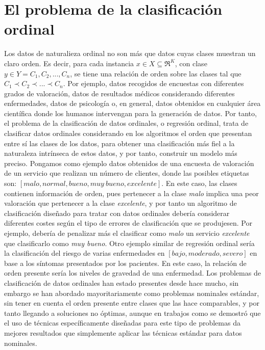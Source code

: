 \section{El problema de la clasificación ordinal}
Los datos de naturalieza ordinal no son más que datos cuyas clases muestran un claro orden. Es decir, para cada instancia $x \in X \subseteq \Re^K $, con clase $y\in Y={C_1,C_2,...,C_n}$, se tiene una relación de orden sobre las clases tal que $C_1 \prec C_2 \prec ... \prec C_n$. Por ejemplo, datos recogidos de encuestas con diferentes grados de valoración, datos de resultados médicos considerando diferentes enfermedades, datos de psicología o, en general, datos obtenidos en cualquier área científica donde los humanos intervengan para la generación de datos. \newline
Por tanto, el problema de la clasificación de datos ordinales, o regresión ordinal, trata de clasificar datos ordinales considerando en los algoritmos el orden que presentan entre sí las clases de los datos, para obtener una clasificación más fiel a la naturaleza intrínseca de estos datos, y por tanto, construir un modelo más preciso. Pongamos como ejemplo datos obtenidos de una encuesta de valoración de un servicio que realizan un número de clientes, donde las posibles etiquetas son: \textit{$\left[malo, normal, bueno, muy\ bueno, excelente\right]$}. En este caso, las clases contienen información de orden, pues pertenecer a la clase \textit{malo} implica una peor valoración que pertenecer a la clase \textit{excelente}, y por tanto un algoritmo de clasificación diseñado para tratar con datos ordinales debería considerar diferentes costes según el tipo de errores de clasificación que se produjesen. Por ejemplo, debería de penalizar más el clasificar como \textit{malo} un servicio \textit{excelente} que clasificarlo como \textit{muy bueno}. Otro ejemplo similar de regresión ordinal sería la clasificación del riesgo de varias enfermedades en \textit{$\left[bajo, moderado, severo\right]$} en base a los síntomas presentados por los pacientes. En este caso, la relación de orden presente sería los niveles de gravedad de una enfermedad. \newline
Los problemas de clasificación de datos ordinales han estado presentes desde hace mucho, sin embargo se han abordado mayoritariamente como problemas nominales estándar, sin tener en cuenta el orden presente entre clases que las hace comparables, y por tanto llegando a soluciones no óptimas, aunque en trabajos como \cite{Gutiérrez2016} se demostró que el uso de técnicas específicamente diseñadas para este tipo de problemas da mejores resultados que simplemente aplicar las técnicas estándar para datos nominales. 

